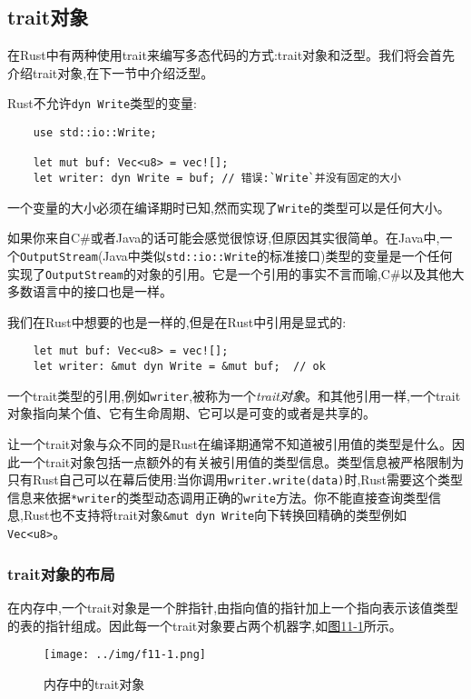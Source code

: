 \subsection{trait对象}\label{traitobject}
在Rust中有两种使用trait来编写多态代码的方式:trait对象和泛型。我们将会首先介绍trait对象,在下一节中介绍泛型。

Rust不允许\texttt{dyn Write}类型的变量:
\begin{verbatim}
    use std::io::Write;

    let mut buf: Vec<u8> = vec![];
    let writer: dyn Write = buf; // 错误:`Write`并没有固定的大小
\end{verbatim}

一个变量的大小必须在编译期时已知,然而实现了\texttt{Write}的类型可以是任何大小。

如果你来自C\#或者Java的话可能会感觉很惊讶,但原因其实很简单。在Java中,一个\texttt{OutputStream}(Java中类似\texttt{std::io::Write}的标准接口)类型的变量是一个任何实现了\texttt{OutputStream}的对象的引用。它是一个引用的事实不言而喻,C\#以及其他大多数语言中的接口也是一样。

我们在Rust中想要的也是一样的,但是在Rust中引用是显式的:
\begin{verbatim}
    let mut buf: Vec<u8> = vec![];
    let writer: &mut dyn Write = &mut buf;  // ok
\end{verbatim}

一个trait类型的引用,例如\texttt{writer},被称为一个\emph{trait对象}。和其他引用一样,一个trait对象指向某个值、它有生命周期、它可以是可变的或者是共享的。

让一个trait对象与众不同的是Rust在编译期通常不知道被引用值的类型是什么。因此一个trait对象包括一点额外的有关被引用值的类型信息。类型信息被严格限制为只有Rust自己可以在幕后使用:当你调用\texttt{writer.write(data)}时,Rust需要这个类型信息来依据\texttt{*writer}的类型动态调用正确的\texttt{write}方法。你不能直接查询类型信息,Rust也不支持将trait对象\texttt{\&mut dyn Write}向下转换回精确的类型例如\texttt{Vec<u8>}。

\subsubsection{trait对象的布局}
在内存中,一个trait对象是一个胖指针,由指向值的指针加上一个指向表示该值类型的表的指针组成。因此每一个trait对象要占两个机器字,如\hyperref[f11-1]{图11-1}所示。

\begin{figure}[htbp]
    \centering
    \texttt{[image: ../img/f11-1.png]}
    \caption{内存中的trait对象}
    \label{f11-1}
\end{figure}

